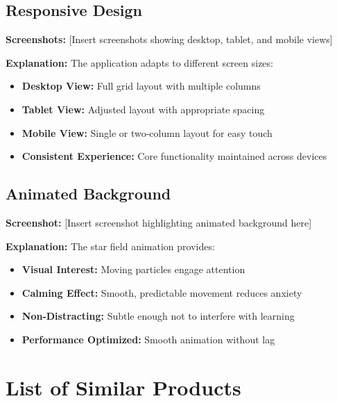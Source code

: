 \documentclass[12pt,a4paper]{article}
\begin{document}
\subsection{Responsive Design}
\textbf{Screenshots:} [Insert screenshots showing desktop, tablet, and mobile views]

\textbf{Explanation:}
The application adapts to different screen sizes:
\begin{itemize}
    \item \textbf{Desktop View:} Full grid layout with multiple columns
    \item \textbf{Tablet View:} Adjusted layout with appropriate spacing
    \item \textbf{Mobile View:} Single or two-column layout for easy touch
    \item \textbf{Consistent Experience:} Core functionality maintained across devices
\end{itemize}

\subsection{Animated Background}
\textbf{Screenshot:} [Insert screenshot highlighting animated background here]

\textbf{Explanation:}
The star field animation provides:
\begin{itemize}
    \item \textbf{Visual Interest:} Moving particles engage attention
    \item \textbf{Calming Effect:} Smooth, predictable movement reduces anxiety
    \item \textbf{Non-Distracting:} Subtle enough not to interfere with learning
    \item \textbf{Performance Optimized:} Smooth animation without lag
\end{itemize}

\newpage
\section{List of Similar Products}
\end{document}
